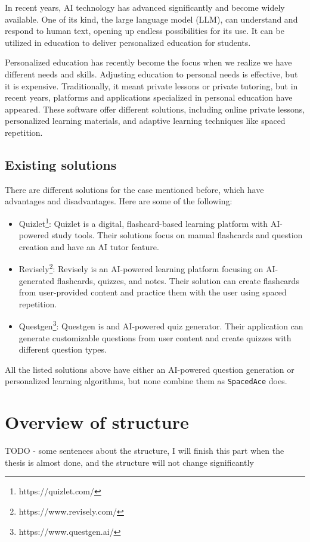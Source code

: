 In recent years, AI technology has advanced significantly and become widely available. One of its kind, the large language model (LLM), can understand and respond to human text, opening up endless possibilities for its use. It can be utilized in education to deliver personalized education for students.

Personalized education has recently become the focus when we realize we have different needs and skills. Adjusting education to personal needs is effective, but it is expensive. Traditionally, it meant private lessons or private tutoring, but in recent years, platforms and applications specialized in personal education have appeared. These software offer different solutions, including online private lessons, personalized learning materials, and adaptive learning techniques like spaced repetition.

\subsection{Existing solutions}

There are different solutions for the case mentioned before, which have advantages and disadvantages. Here are some of the following:

\begin{itemize}
    \item{Quizlet\footnote{https://quizlet.com/}}: Quizlet is a digital, flashcard-based learning platform with AI-powered study tools. Their solutions focus on manual flashcards and question creation and have an AI tutor feature.
    \item{Revisely\footnote{https://www.revisely.com/}}: Revisely is an AI-powered learning platform focusing on AI-generated flashcards, quizzes, and notes. Their solution can create flashcards from user-provided content and practice them with the user using spaced repetition.
    \item{Questgen\footnote{https://www.questgen.ai/}}: Questgen is and AI-powered quiz generator. Their application can generate customizable questions from user content and create quizzes with different question types.
\end{itemize}

All the listed solutions above have either an AI-powered question generation or personalized learning algorithms, but none combine them as \texttt{SpacedAce} does.

\section{Overview of structure}
TODO - some sentences about the structure, I will finish this part when the thesis is almost done, and the structure will not change significantly
